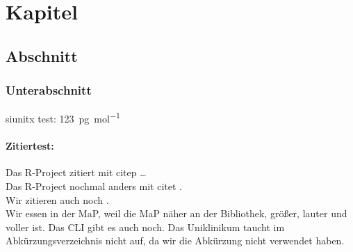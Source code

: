 \chapter{Kapitel}

\section{Abschnitt}

\subsection{Unterabschnitt}
siunitx test: \SI{123}{\pico\gram\per\mole}

\blindtext

\subsubsection{Zitiertest:}
Das R-Project zitiert mit citep \citep{RPROJECT} \dots \\
Das R-Project nochmal anders mit citet \citet{RPROJECT}. \\
Wir zitieren auch noch \citep{KM80}. \\

Wir essen in der \ac{MaP}, weil die \ac{MaP} näher an der Bibliothek, größer,
lauter und voller ist. Das \ac{CLI} gibt es auch noch. Das Uniklinikum taucht im
Abkürzungsverzeichnis nicht auf, da wir die Abkürzung nicht verwendet haben.
